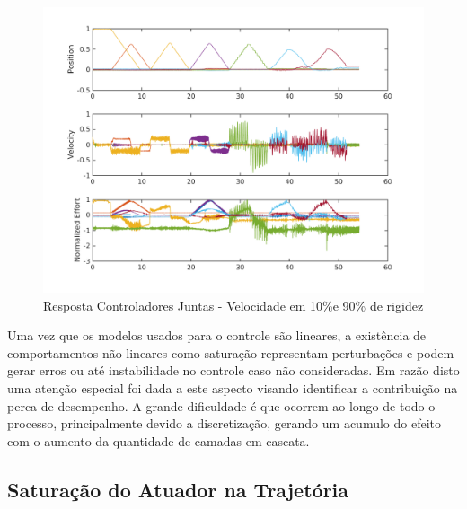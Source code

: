 \begin{figure}[H]
    \centering
    \includegraphics[width = \linewidth]{tex/figs/jointIdentificationSpeed10p_stiff90p2.png}
    \caption{Resposta Controladores Juntas - Velocidade em 10\%e 90\% de rigidez}
    \label{fig:jointIdentificationSpeed10p_stiff90p2}
\end{figure}



Uma vez que os modelos usados para o controle são lineares, a existência de comportamentos não lineares como saturação representam perturbações e podem gerar erros ou até instabilidade no controle caso não consideradas. Em razão disto uma atenção especial foi dada a este aspecto visando identificar a contribuição na perca de desempenho. A grande dificuldade é que ocorrem ao longo de todo o processo, principalmente devido a discretização, gerando um acumulo do efeito com o aumento da quantidade de camadas em cascata.

\subsection{Saturação do Atuador na Trajetória}

